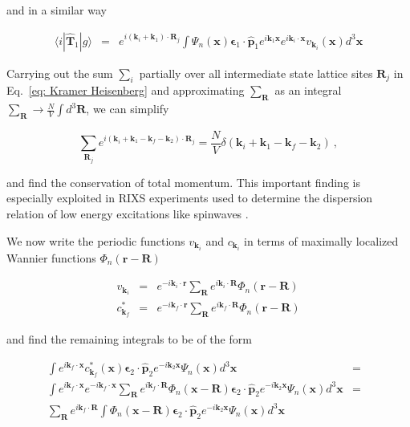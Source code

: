 \documentclass[twocolumn,prb,twocolumn,amsmath,superscriptaddress,nofootinbib,amssymb]{revtex4-1}
\newcommand{\vect}[1]{\boldsymbol{#1}}
\begin{document}
\begin{widetext}
\noindent and in a similar way

\begin{eqnarray}
\langle i|\hat{\vect{T}}_1 |g\rangle &=&  e^{i(\vect{k}_i+\vect{k}_1)\cdot\vect{R}_j}
\int \Psi_n(\vect{x})  \vect{\epsilon}_1\cdot \hat{\vect{p}}_1 e^{i \vect{k}_1 \vect{x}} e^{i\vect{k}_i\cdot\vect{x}}v_{\vect{k}_i}(\vect{x}) d^3\vect{x}
\end{eqnarray}

Carrying out the sum $\sum_i$ partially over all intermediate state lattice sites $\vect{R}_j$ in Eq.~\ref{eq: Kramer Heisenberg} and approximating $\sum_{\vect{R}}$ as an integral $\sum_{\vect{R}}\rightarrow\frac{N}{V}\int d^3\vect{R}$, we can simplify

\begin{equation}
\sum_{\vect{R}_j} e^{i(\vect{k}_i+\vect{k}_1-\vect{k}_f-\vect{k}_2)\cdot\vect{R}_j}=\frac{N}{V}\delta(\vect{k}_i+\vect{k}_1-\vect{k}_f-\vect{k}_2)~,
\end{equation}

\noindent and find the conservation of total momentum. This important finding is especially exploited in RIXS experiments used to determine the dispersion relation of low energy excitations like spinwaves \cite{Guarise2010,Braicovich2009}.

We now write the periodic functions $v_{\vect{k}_i}$ and $c_{\vect{k}_i}$ in terms of maximally localized Wannier functions $\Phi_n(\vect{r}-\vect{R})$

\begin{eqnarray}
v_{\vect{k}_i} & = & e^{-i \vect{k}_i\cdot\vect{r}}\sum_{\vect{R}}e^{i \vect{k}_i\cdot\vect{R}}\Phi_n(\vect{r}-\vect{R})\\
c^*_{\vect{k}_f} & = & e^{-i \vect{k}_f\cdot\vect{r}}\sum_{\vect{R}}e^{i \vect{k}_f\cdot\vect{R}}\Phi_n(\vect{r}-\vect{R})
\end{eqnarray}

\noindent and find the remaining integrals to be of the form

\begin{eqnarray}
\int e^{i\vect{k}_f\cdot\vect{x}}c^*_{\vect{k}_f}(\vect{x}) \vect{\epsilon}_2\cdot \hat{\vect{p}}_2 e^{-i \vect{k}_2 \vect{x}}\Psi_n(\vect{x})d^3\vect{x} & = &\nonumber\\
\int e^{i\vect{k}_f\cdot\vect{x}}e^{-i \vect{k}_f\cdot\vect{x}}\sum_{\vect{R}}e^{i \vect{k}_f\cdot\vect{R}}\Phi_n(\vect{x}-\vect{R}) \vect{\epsilon}_2\cdot \hat{\vect{p}}_2 e^{-i \vect{k}_2 \vect{x}}\Psi_n(\vect{x})d^3\vect{x}\nonumber&=&\\
\sum_{\vect{R}}e^{i \vect{k}_f\cdot\vect{R}} \int \Phi_n(\vect{x}-\vect{R}) \vect{\epsilon}_2\cdot \hat{\vect{p}}_2 e^{-i \vect{k}_2 \vect{x}}\Psi_n(\vect{x})d^3\vect{x}
\end{eqnarray}


\end{widetext}
\end{document}
